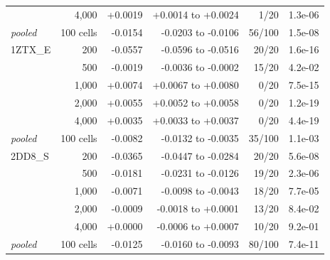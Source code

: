 \documentclass[11pt,a4paper]{article}
\begin{document}
\begin{table}[h]
\begin{tabular}{@{}lrrrrr@{}}
 & 4,000 & +0.0019 & +0.0014 to +0.0024 & 1/20 & 1.3e-06 \\
\textit{pooled} & 100 cells & -0.0154 & -0.0203 to -0.0106 & 56/100 & 1.5e-08 \\
\midrule
1ZTX\_E & 200 & -0.0557 & -0.0596 to -0.0516 & 20/20 & 1.6e-16 \\
 & 500 & -0.0019 & -0.0036 to -0.0002 & 15/20 & 4.2e-02 \\
 & 1,000 & +0.0074 & +0.0067 to +0.0080 & 0/20 & 7.5e-15 \\
 & 2,000 & +0.0055 & +0.0052 to +0.0058 & 0/20 & 1.2e-19 \\
 & 4,000 & +0.0035 & +0.0033 to +0.0037 & 0/20 & 4.4e-19 \\
\textit{pooled} & 100 cells & -0.0082 & -0.0132 to -0.0035 & 35/100 & 1.1e-03 \\
\midrule
2DD8\_S & 200 & -0.0365 & -0.0447 to -0.0284 & 20/20 & 5.6e-08 \\
 & 500 & -0.0181 & -0.0231 to -0.0126 & 19/20 & 2.3e-06 \\
 & 1,000 & -0.0071 & -0.0098 to -0.0043 & 18/20 & 7.7e-05 \\
 & 2,000 & -0.0009 & -0.0018 to +0.0001 & 13/20 & 8.4e-02 \\
 & 4,000 & +0.0000 & -0.0006 to +0.0007 & 10/20 & 9.2e-01 \\
\textit{pooled} & 100 cells & -0.0125 & -0.0160 to -0.0093 & 80/100 & 7.4e-11 \\
\bottomrule
\end{tabular}
\end{table}
\end{document}
